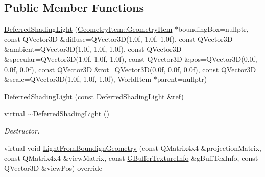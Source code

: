 \subsection*{Public Member Functions}
\begin{DoxyCompactItemize}
\item 
\mbox{\hyperlink{class_geometry_engine_1_1_geometry_world_item_1_1_geometry_light_1_1_deferred_shading_light_ac5d6155ce4539820a6e93a733a67fb3f}{Deferred\+Shading\+Light}} (\mbox{\hyperlink{class_geometry_engine_1_1_geometry_world_item_1_1_geometry_item_1_1_geometry_item}{Geometry\+Item\+::\+Geometry\+Item}} $\ast$bounding\+Box=nullptr, const Q\+Vector3D \&diffuse=Q\+Vector3D(1.\+0f, 1.\+0f, 1.\+0f), const Q\+Vector3\+D \&ambient=\+Q\+Vector3\+D(1.\+0f, 1.\+0f, 1.\+0f), const Q\+Vector3\+D \&specular=\+Q\+Vector3\+D(1.\+0f, 1.\+0f, 1.\+0f), const Q\+Vector3\+D \&pos=\+Q\+Vector3\+D(0.\+0f, 0.\+0f, 0.\+0f), const Q\+Vector3\+D \&rot=\+Q\+Vector3\+D(0.\+0f, 0.\+0f, 0.\+0f), const Q\+Vector3\+D \&scale=\+Q\+Vector3\+D(1.\+0f, 1.\+0f, 1.\+0f), World\+Item $\ast$parent=nullptr)
\item 
\mbox{\hyperlink{class_geometry_engine_1_1_geometry_world_item_1_1_geometry_light_1_1_deferred_shading_light_a0fd11e2d72e7cc625d9ff63ab5757651}{Deferred\+Shading\+Light}} (const \mbox{\hyperlink{class_geometry_engine_1_1_geometry_world_item_1_1_geometry_light_1_1_deferred_shading_light}{Deferred\+Shading\+Light}} \&ref)
\item 
\mbox{\label{class_geometry_engine_1_1_geometry_world_item_1_1_geometry_light_1_1_deferred_shading_light_ae192a09794050997ecdd669bbd2888ba}} 
virtual \mbox{\hyperlink{class_geometry_engine_1_1_geometry_world_item_1_1_geometry_light_1_1_deferred_shading_light_ae192a09794050997ecdd669bbd2888ba}{$\sim$\+Deferred\+Shading\+Light}} ()
\begin{DoxyCompactList}\small\item\em Destructor. \end{DoxyCompactList}\item 
virtual void \mbox{\hyperlink{class_geometry_engine_1_1_geometry_world_item_1_1_geometry_light_1_1_deferred_shading_light_a2071d92505a56dfb846b87c2aca9b94b}{Light\+From\+Boundign\+Geometry}} (const Q\+Matrix4x4 \&projection\+Matrix, const Q\+Matrix4x4 \&view\+Matrix, const \mbox{\hyperlink{class_geometry_engine_1_1_g_buffer_texture_info}{G\+Buffer\+Texture\+Info}} \&g\+Buff\+Tex\+Info, const Q\+Vector3D \&view\+Pos) override

\end{DoxyCompactItemize}
